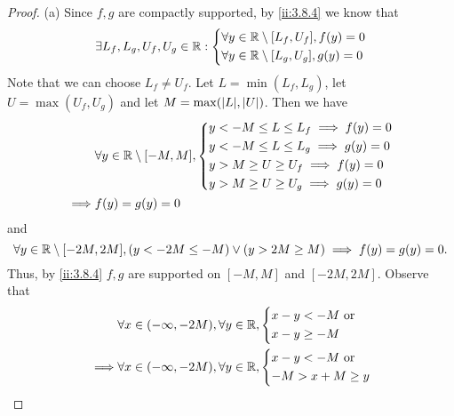 \begin{proof}{(a)}
  Since \(f, g\) are compactly supported, by \cref{ii:3.8.4} we know that
  \[
    \exists L_f, L_g, U_f, U_g \in \mathbb{R} : \begin{dcases}
      \forall y \in \mathbb{R} \setminus [L_f, U_f], f(y) = 0 \\
      \forall y \in \mathbb{R} \setminus [L_g, U_g], g(y) = 0
    \end{dcases}
  \]
  Note that we can choose \(L_f \neq U_f\).
  Let \(L = \min(L_f, L_g)\), let \(U = \max(U_f, U_g)\) and let \(M = \max(\abs{L}, \abs{U})\).
  Then we have
  \begin{align*}
             & \forall y \in \mathbb{R} \setminus [-M, M], \begin{dcases}
                                                     y < -M \leq L \leq L_f \implies f(y) = 0 \\
                                                     y < -M \leq L \leq L_g \implies g(y) = 0 \\
                                                     y > M \geq U \geq U_f \implies f(y) = 0  \\
                                                     y > M \geq U \geq U_g \implies g(y) = 0
                                                   \end{dcases} \\
    \implies & f(y) = g(y) = 0
  \end{align*}
  and
  \[
    \forall y \in \mathbb{R} \setminus [-2M, 2M], (y < -2M \leq -M) \lor (y > 2M \geq M) \implies f(y) = g(y) = 0.
  \]
  Thus, by \cref{ii:3.8.4} \(f, g\) are supported on \([-M, M]\) and \([-2M, 2M]\).
  Observe that
  \begin{align*}
             & \forall x \in (-\infty, -2M), \forall y \in \R, \begin{dcases}
                                                                 x - y < -M \text{ or } \\
                                                                 x - y \geq -M
                                                               \end{dcases}                      \\
    \implies & \forall x \in (-\infty, -2M), \forall y \in \R, \begin{dcases}
                                                                 x - y < -M \text{ or } \\
                                                                 -M > x + M \geq y

\end{dcases}
\end{align*}
\end{proof}
